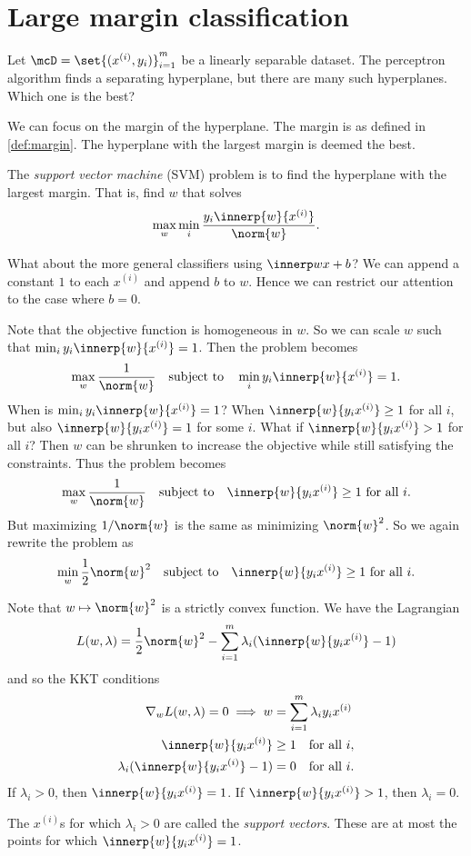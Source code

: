 \chapter{Large margin classification} \label{chp:svm}
Let $\mcD = \set{(x^{(i)}, y_i)}_{i=1}^m$ be a linearly separable dataset.
The perceptron algorithm finds a separating hyperplane,
but there are many such hyperplanes.
Which one is the best?

We can focus on the margin of the hyperplane.
The margin is as defined in \cref{def:margin}.
The hyperplane with the largest margin is deemed the best.

\begin{definition*} \label{def:svm-false}
    The \emph{support vector machine} (SVM) problem is to find the
    hyperplane with the largest margin.
    That is, find $w$ that solves \[
        \max_w \min_i \frac{y_i \innerp{w}{x^{(i)}}}{\norm{w}}.
    \]
\end{definition*}
What about the more general classifiers using $\innerp w x + b$?
We can append a constant $1$ to each $x^{(i)}$ and append $b$ to $w$.
Hence we can restrict our attention to the case where $b = 0$.

Note that the objective function is homogeneous in $w$.
So we can scale $w$ such that $\min_i y_i \innerp{w}{x^{(i)}} = 1$.
Then the problem becomes \[
    \max_w \frac1{\norm{w}} \quad \text{subject to} \quad
    \min_i y_i \innerp{w}{x^{(i)}} = 1.
\] When is $\min_i y_i \innerp{w}{x^{(i)}} = 1$?
When $\innerp{w}{y_i x^{(i)}} \ge 1$ for all $i$, but also
$\innerp{w}{y_i x^{(i)}} = 1$ for some $i$.
What if $\innerp{w}{y_i x^{(i)}} > 1$ for all $i$?
Then $w$ can be shrunken to increase the objective while still satisfying
the constraints.
Thus the problem becomes \[
    \max_w \frac1{\norm{w}} \quad \text{subject to} \quad
    \innerp{w}{y_i x^{(i)}} \ge 1 \text{ for all } i.
\] But maximizing $1/\norm{w}$ is the same as minimizing $\norm{w}^2$.
So we again rewrite the problem as \[
    \min_w \frac12 \norm{w}^2 \quad \text{subject to} \quad
    \innerp{w}{y_i x^{(i)}} \ge 1 \text{ for all } i.
\]

Note that $w \mapsto \norm{w}^2$ is a strictly convex function.
We have the Lagrangian \[
    L(w, \lambda) = \frac12 \norm{w}^2
        - \sum_{i=1}^m \lambda_i (\innerp{w}{y_i x^{(i)}} - 1)
\] and so the KKT conditions \begin{align}
    \nabla_w L(w, \lambda) = 0 \implies
        w &= \sum_{i=1}^m \lambda_i y_i x^{(i)} \label{eq:svm-w} \\
    \innerp{w}{y_i x^{(i)}} &\ge 1 \quad \text{for all } i, \\
    \lambda_i (\innerp{w}{y_i x^{(i)}} - 1) &= 0 \quad \text{for all } i.
\end{align}
If $\lambda_i > 0$, then $\innerp{w}{y_i x^{(i)}} = 1$.
If $\innerp{w}{y_i x^{(i)}} > 1$, then $\lambda_i = 0$.

The $x^{(i)}$s for which $\lambda_i > 0$ are called the
\emph{support vectors}.
These are at most the points for which $\innerp{w}{y_i x^{(i)}} = 1$.

